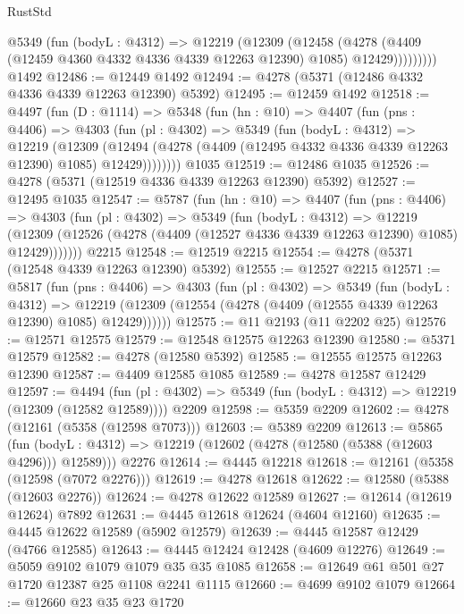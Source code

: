 \begin{lexlean}{RustStd}
\begin{coremodule}
            @5349
              (fun (bodyL : @4312) =>
              @12219
                (@12309
                  (@12458
                    (@4278
                      (@4409 (@12459 @4360 @4332 @4336 @4339 @12263 @12390) @1085)
                      @12429)))))))))
    @1492
@12486 := @12449 @1492
@12494 := @4278 (@5371 (@12486 @4332 @4336 @4339 @12263 @12390) @5392)
@12495 := @12459 @1492
@12518 := @4497
    (fun (D : @1114) =>
    @5348
      (fun (hn : @10) =>
      @4407
        (fun (pns : @4406) =>
        @4303
          (fun (pl : @4302) =>
          @5349
            (fun (bodyL : @4312) =>
            @12219
              (@12309
                (@12494 (@4278 (@4409 (@12495 @4332 @4336 @4339 @12263 @12390) @1085) @12429))))))))
    @1035
@12519 := @12486 @1035
@12526 := @4278 (@5371 (@12519 @4336 @4339 @12263 @12390) @5392)
@12527 := @12495 @1035
@12547 := @5787
    (fun (hn : @10) =>
    @4407
      (fun (pns : @4406) =>
      @4303
        (fun (pl : @4302) =>
        @5349
          (fun (bodyL : @4312) =>
          @12219
            (@12309 (@12526 (@4278 (@4409 (@12527 @4336 @4339 @12263 @12390) @1085) @12429)))))))
    @2215
@12548 := @12519 @2215
@12554 := @4278 (@5371 (@12548 @4339 @12263 @12390) @5392)
@12555 := @12527 @2215
@12571 := @5817
    (fun (pns : @4406) =>
    @4303
      (fun (pl : @4302) =>
      @5349
        (fun (bodyL : @4312) =>
        @12219 (@12309 (@12554 (@4278 (@4409 (@12555 @4339 @12263 @12390) @1085) @12429))))))
@12575 := @11 @2193 (@11 @2202 @25)
@12576 := @12571 @12575
@12579 := @12548 @12575 @12263 @12390
@12580 := @5371 @12579
@12582 := @4278 (@12580 @5392)
@12585 := @12555 @12575 @12263 @12390
@12587 := @4409 @12585 @1085
@12589 := @4278 @12587 @12429
@12597 := @4494
    (fun (pl : @4302) => @5349 (fun (bodyL : @4312) => @12219 (@12309 (@12582 @12589))))
    @2209
@12598 := @5359 @2209
@12602 := @4278 (@12161 (@5358 (@12598 @7073)))
@12603 := @5389 @2209
@12613 := @5865
    (fun (bodyL : @4312) => @12219 (@12602 (@4278 (@12580 (@5388 (@12603 @4296))) @12589)))
    @2276
@12614 := @4445 @12218
@12618 := @12161 (@5358 (@12598 (@7072 @2276)))
@12619 := @4278 @12618
@12622 := @12580 (@5388 (@12603 @2276))
@12624 := @4278 @12622 @12589
@12627 := @12614 (@12619 @12624) @7892
@12631 := @4445 @12618 @12624 (@4604 @12160)
@12635 := @4445 @12622 @12589 (@5902 @12579)
@12639 := @4445 @12587 @12429 (@4766 @12585)
@12643 := @4445 @12424 @12428 (@4609 @12276)
@12649 := @5059 @9102 @1079 @1079 @35 @35 @1085
@12658 := @12649 @61 @501 @27 @1720 @12387 @25 @1108 @2241 @1115
@12660 := @4699 @9102 @1079
@12664 := @12660 @23 @35 @23 @1720

\end{coremodule}
\end{lexlean}
